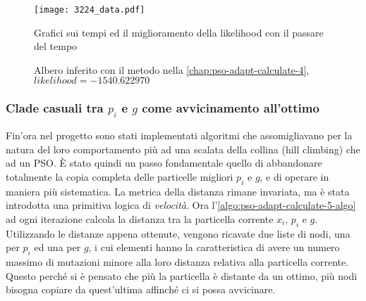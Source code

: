 \begin{figure}[!h]
  \centering
  \texttt{[image: 3224\_data.pdf]}
  \caption{Grafici sui tempi ed il miglioramento della likelihood con il passare del tempo}
  \label{fig:pso-adapt-calculate-4-data}
\end{figure}

\begin{figure}[!h]
  \centering
  \caption{Albero inferito con il metodo nella \autoref{chap:pso-adapt-calculate-4}, $likelihood = -1540.622970$}
  \label{fig:pso-adapt-calculate-4-tree}
\end{figure}
\subsubsection{Clade casuali tra $p_i$ e $g$ come avvicinamento all'ottimo}
\label{chap:pso-adapt-calculate-5}
Fin'ora nel progetto sono stati implementati algoritmi che assomigliavano per la natura del loro comportamento più ad una scalata della collina (hill climbing) che ad un PSO. È stato quindi un passo fondamentale quello di abbandonare totalmente la copia completa delle particelle migliori $p_i$ e $g$, e di operare in maniera più sistematica.
La metrica della distanza rimane invariata, ma è stata introdotta una primitiva logica di \textit{velocità}. Ora l'\autoref{algo:pso-adapt-calculate-5-algo} ad ogni iterazione calcola la distanza tra la particella corrente $x_i$, $p_i$ e $g$. Utilizzando le distanze appena ottenute, vengono ricavate due liste di nodi, una per $p_i$ ed una per $g$, i cui elementi hanno la caratteristica di avere un numero massimo di mutazioni minore alla loro distanza relativa alla particella corrente. Questo perché si è pensato che più la particella è distante da un ottimo, più nodi bisogna copiare da quest'ultima affinché ci si possa avvicinare.

